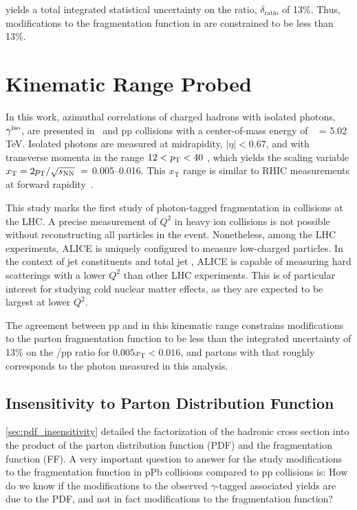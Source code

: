yields a total integrated statistical uncertainty on the ratio, $\delta_\mathrm{ratio}$ of 13\%. Thus, modifications to the fragmentation function in \pPb are constrained to be less than 13\%.


\section{Kinematic Range Probed}

In this work, azimuthal correlations of charged hadrons with isolated photons, $\gamma^\mathrm{iso}$, are presented in \pPb~and pp collisions with a center-of-mass energy of \sqrtsNN~ = 5.02 TeV. Isolated photons are measured at midrapidity, {$|\eta|<0.67$}, and with transverse momenta in the range $12 <p_{\mathrm{T}}<40$ \GeVc, which yields the scaling variable {$x_{\mathrm{T}} = 2\pt/\sqrt{s_{\mathrm{NN}}}\ = $ 0.005--0.016}. This $x_{\mathrm{T}}$ range is similar to RHIC measurements at forward rapidity~\cite{Adare:2011sc}.

This study marks the first study of photon-tagged fragmentation in \pPb collisions at the LHC. A precise measurement of $Q^2$ in heavy ion collisions is not possible without reconstructing all particles in the event. Nonetheless, among the LHC experiments, ALICE is uniquely configured to measure low-\pt charged particles. In the context of jet constituents and total jet \pt, ALICE is capable of measuring hard scatterings with a lower $Q^{2}$ than other LHC experiments. This is of particular interest for studying cold nuclear matter effects, as they are expected to be largest at lower $Q^{2}$. 

The agreement between pp and \pPb in this kinematic range constrains modifications to the parton fragmentation function to be less than the integrated uncertainty of 13\% on the \pPb/pp ratio for $ 0.005 x_{\mathrm{T}} < 0.016$, and partons with \pt that roughly corresponds to the photon \pt measured in this analysis.

\subsection{Insensitivity to Parton Distribution Function}
\ref{sec:pdf_insensitivity} detailed the factorization of the hadronic cross section into the product of the parton distribution function (PDF) and the fragmentation function (FF). A very important question to answer for the study modifications to the fragmentation function in pPb collisions compared to pp collisions is: How do we know if the modifications to the observed $\gamma$-tagged associated yields are due to the PDF, and not in fact modifications to the fragmentation function?

